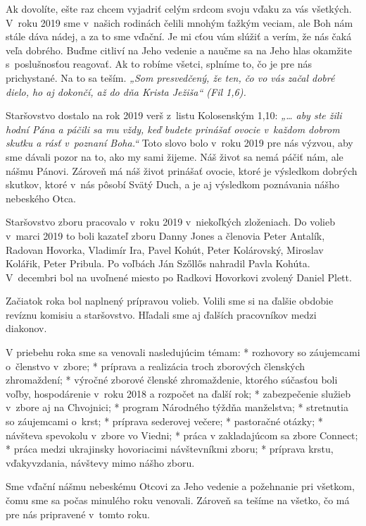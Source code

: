Ak dovolíte, ešte raz chcem vyjadriť celým srdcom svoju vďaku za vás všetkých.  V~roku 2019 sme v~našich rodinách čelili mnohým ťažkým veciam, ale Boh nám stále dáva nádej, a za to sme vďační. Je mi cťou vám slúžiť a verím, že nás čaká veľa dobrého. Buďme citliví na Jeho vedenie a naučme sa na Jeho hlas okamžite s~poslušnosťou reagovať. Ak to robíme všetci, splníme to, čo je pre nás prichystané. Na to sa teším. {\it „Som presvedčený, že ten, čo vo vás začal dobré dielo, ho aj dokončí, až do dňa Krista Ježiša“ {\em (Fil 1,6)}.}



Staršovstvo dostalo na rok 2019 verš z~listu Kolosenským 1,10: {\it „… aby ste žili hodní Pána a páčili sa mu vždy, keď budete prinášať ovocie v~každom dobrom skutku a rásť v~poznaní Boha.“} Toto slovo bolo v~roku 2019 pre nás výzvou, aby sme dávali pozor na to, ako my sami žijeme. Náš život sa nemá páčiť nám, ale nášmu Pánovi. Zároveň má náš život prinášať ovocie, ktoré je výsledkom dobrých skutkov, ktoré v~nás pôsobí Svätý Duch, a je aj výsledkom poznávania nášho nebeského Otca.

Staršovstvo zboru pracovalo v~roku 2019 v~niekoľkých zloženiach. Do volieb v~marci 2019 to boli kazateľ zboru Danny Jones a členovia Peter Antalík, Radovan Hovorka, Vladimír Ira, Pavel Kohút, Peter Kolárovský, Miroslav Kolářik, Peter Pribula. Po voľbách Ján Szőllős nahradil Pavla Kohúta. V~decembri bol na uvoľnené miesto po Radkovi Hovorkovi zvolený Daniel Plett.

Začiatok roka bol naplnený prípravou volieb. Volili sme si na ďalšie obdobie revíznu komisiu a staršovstvo. Hľadali sme aj ďalších pracovníkov medzi diakonov.

V priebehu roka sme sa venovali nasledujúcim témam:
\begitems
* rozhovory so záujemcami o~členstvo v~zbore;
* príprava a realizácia troch zborových členských zhromaždení;
* výročné zborové členské zhromaždenie, ktorého súčasťou boli voľby, hospodárenie v~roku 2018 a rozpočet na ďalší rok;
* zabezpečenie služieb v~zbore aj na Chvojnici;
* program Národného týždňa manželstva;
* stretnutia so záujemcami o~krst;
* príprava sederovej večere;
* pastoračné otázky;
* návšteva spevokolu v~zbore vo Viedni;
* práca v zakladajúcom sa zbore Connect;
* práca medzi ukrajinsky hovoriacimi návštevníkmi zboru;
* príprava krstu, vďakyvzdania, návštevy mimo nášho zboru.
\enditems

Sme vďační nášmu nebeskému Otcovi za Jeho vedenie a požehnanie pri všetkom, čomu sme sa počas minulého roku venovali. Zároveň sa tešíme na všetko, čo má pre nás pripravené v~tomto roku.

